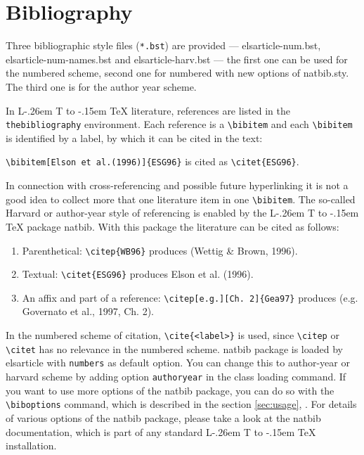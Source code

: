 \documentclass[a4paper,12pt]{article}
\makeatletter
\def\file#1{\textsf{#1}\xspace}
\DeclareRobustCommand{\LaTeX}{L\kern-.26em%
        {\sbox\z@ T%
         \vbox to\ht\z@{\hbox{\check@mathfonts
           \fontsize\sf@size\z@
           \math@fontsfalse\selectfont
          A\,}%
         \vss}%
        }%
     \kern-.15em%
    \TeX}
\makeatother
\begin{document}
\section{Bibliography}

Three bibliographic style files (\verb+*.bst+) are provided ---
\file{elsarticle-num.bst}, \file{elsarticle-num-names.bst} and
\file{elsarticle-harv.bst} --- the first one can be used for the
numbered scheme, second one for numbered with new options of 
\file{natbib.sty}. The third one is for the author year
scheme.

In \LaTeX{} literature, references are listed in the
\verb+thebibliography+ environment.  Each reference is a
\verb+\bibitem+ and each \verb+\bibitem+ is identified by a label,
by which it can be cited in the text:

\verb+\bibitem[Elson et al.(1996)]{ESG96}+ is cited as
\verb+\citet{ESG96}+. 

\noindent In connection with cross-referencing and
possible future hyperlinking it is not a good idea to collect
more that one literature item in one \verb+\bibitem+.  The
so-called Harvard or author-year style of referencing is enabled
by the \LaTeX{} package \file{natbib}. With this package the
literature can be cited as follows:

\begin{enumerate}[\textbullet]
\item Parenthetical: \verb+\citep{WB96}+ produces (Wettig \& Brown, 1996).
\item Textual: \verb+\citet{ESG96}+ produces Elson et al. (1996).
\item An affix and part of a reference:
\verb+\citep[e.g.][Ch. 2]{Gea97}+ produces (e.g. Governato et
al., 1997, Ch. 2).
\end{enumerate}

In the numbered scheme of citation, \verb+\cite{<label>}+ is used,
since \verb+\citep+ or \verb+\citet+ has no relevance in the numbered
scheme.  \file{natbib} package is loaded by \file{elsarticle} with
\verb+numbers+ as default option.  You can change this to author-year
or harvard scheme by adding option \verb+authoryear+ in the class
loading command.  If you want to use more options of the \file{natbib}
package, you can do so with the \verb+\biboptions+ command, which is
described in the section \ref{sec:usage}, .  For
details of various options of the \file{natbib} package, please take a
look at the \file{natbib} documentation, which is part of any standard
\LaTeX{} installation.
\end{document}
